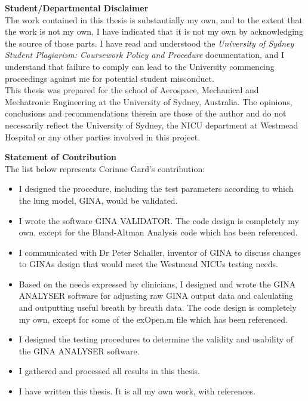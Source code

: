 \documentclass[12pt, openany, oneside]{book}
\newcommand\blankpage{
	\null
	\thispagestyle{empty}
	\addtocounter{page}{-1}
	\newpage
	}
\begin{document}
\afterpage{\blankpage}



\clearpage
{\Large \bfseries Student/Departmental Disclaimer}\\

The work contained in this thesis is substantially my own, and to the extent that the work is not my own, I have indicated that it is not my own by acknowledging the source of those parts. I have read and understood the \textit{University of Sydney Student Plagiarism: Coursework Policy and Procedure} documentation, and I understand that failure to comply can lead to the University commencing proceedings against me for potential student misconduct.\\

This thesis was prepared for the school of Aerospace, Mechanical and Mechatronic Engineering at the University of Sydney, Australia. The opinions, conclusions and recommendations therein are those of the author and do not necessarily reflect the University of Sydney, the NICU department at Westmead Hospital or any other parties involved in this project.


\clearpage
{\Large \bfseries Statement of Contribution}\\

The list below represents Corinne Gard's contribution:

\begin{itemize}
\renewcommand{\labelitemi}{\scriptsize$\blacksquare$}

\item I designed the procedure, including the test parameters according to which the lung model, GINA, would be validated.
\item I wrote the software GINA VALIDATOR. The code design is completely my own, except for the Bland-Altman Analysis code which has been referenced.
\item I communicated with Dr Peter Schaller, inventor of GINA to discuss changes to GINAs design that would meet the Westmead NICUs testing needs.
\item Based on the needs expressed by clinicians, I designed and wrote the GINA ANALYSER software for adjusting raw GINA output data and calculating and outputting useful breath by breath data. The code design is completely my own, except for some of the exOpen.m file which has been referenced.
\item I designed the testing procedures to determine the validity and usability of the GINA ANALYSER software.
\item I gathered and processed all results in this thesis.
\item I have written this thesis. It is all my own work, with references. 
\end{itemize}
\end{document}
